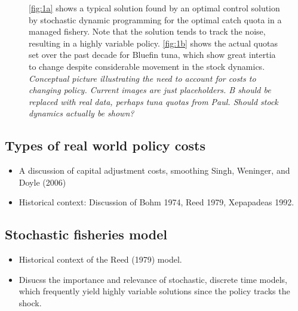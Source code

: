 \documentclass[review, 12pt]{elsarticle}
\begin{document}
\begin{figure}[ht]
  \begin{center}
  \end{center}
  \caption{\ref{fig:1a} shows a typical solution found by an optimal
  control solution by stochastic dynamic programming for the optimal catch
  quota in a managed fishery.  Note that the solution tends to track the
  noise, resulting in a highly variable policy.  \ref{fig:1b} shows the
  actual quotas set over the past decade for Bluefin tuna, which show
  great intertia to change despite considerable movement in the stock
  dynamics.  \emph{Conceptual picture illustrating the need to account
  for costs to changing policy. Current images are just placeholders.
  B should be replaced with real data, perhaps tuna quotas from Paul.
  Should stock dynamics actually be shown?}}
  \label{fig:1}
\end{figure}


\subsection{Types of real world policy costs}

\begin{itemize}
\item A discussion of capital adjustment costs, smoothing Singh, Weninger, and Doyle (2006)
\item Historical context: Discussion of Bohm 1974, Reed 1979, Xepapadeas 1992.
\end{itemize}
\subsection{Stochastic fisheries model}
\begin{itemize}
\item Historical context of the Reed (1979) model.  
\item Disucss the importance and relevance of stochastic, discrete time models, which frequently yield highly variable solutions since the policy tracks the shock.  
\end{itemize}
\end{document}
